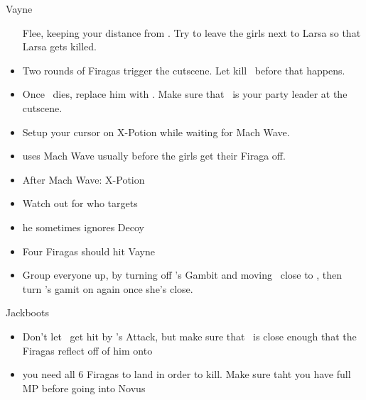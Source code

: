 \begin{battle}{Vayne}
\begin{itemize}
\vaanf Flee, keeping your distance from . Try to leave the girls next to Larsa so that Larsa gets killed.
\item Two rounds of Firagas trigger the cutscene. Let  kill \balthier\ before that happens.
\item Once \balthier\ dies, replace him with \vaan. Make sure that \vaan\ is your party leader at the cutscene.
\item Setup your cursor on X-Potion while waiting for Mach Wave.
\item {} uses Mach Wave usually before the girls get their Firaga off.
\item After Mach Wave:
\vaanf X-Potion \vaan
\item Watch out for who  targets \item  he sometimes ignores Decoy
\item Four Firagas should hit Vayne
\item Group everyone up, by turning off \penelo's Gambit and moving \vaan\ close to \ashe, then turn \penelo's gamit on again once she's close.
\end{itemize}
\begin{equip}
\begin{itemize}\vaanf Jackboots\end{itemize}
\end{equip}
\begin{menu}
\begin{itemize}\battlewait\end{itemize}
\end{menu}
\begin{itemize}
\item Don't let \vaan\ get hit by 's Attack, but make sure that \vaan\ is close enough that the Firagas reflect off of him onto  \item  you need all 6 Firagas to land in order to kill.
\vaanf Make sure taht you have full MP before going into Novus
\end{itemize}
\end{battle}
